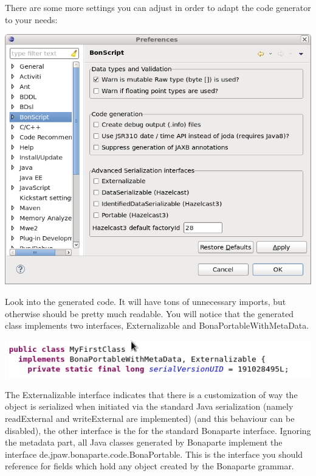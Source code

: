 \documentclass[11pt,a4paper,oneside]{article}
\begin{document}
There are some more settings you can adjust in order to adapt the code generator to your needs:

\vspace{2mm}
\begin{center}
\includegraphics[scale=0.5]{images/tut1-prefs2.png}
\end{center}

Look into the generated code. It will have tons of unnecessary imports, but otherwise should be pretty much readable.
You will notice that the generated class implements two interfaces, {\ttfamily Externalizable} and {\ttfamily BonaPortableWithMetaData}.

\vspace{2mm}
\hspace{1cm}\includegraphics[scale=0.5]{images/tut1-004.png}

\noindent
The {\ttfamily Externalizable} interface indicates that there is a customization of way the object is serialized when initiated
via the standard Java serialization (namely {\ttfamily readExternal} and {\ttfamily writeExternal} are implemented) (and this behaviour can be disabled),
the other interface is the for the standard Bonaparte interface. Ignoring the metadata part, all Java classes generated by Bonaparte implement the interface
 {\ttfamily de.jpaw.bonaparte.code.BonaPortable}. This is the interface you should reference for fields which hold any object created by the Bonaparte grammar.
\end{document}
